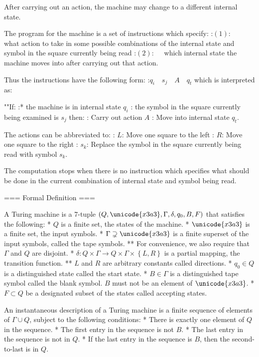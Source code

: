 After carrying out an action, the machine may change to a different internal state.


The program for the machine is a set of instructions which specify:
:$(1): \quad$ what action to take in some possible combinations of the internal state and symbol in the square currently being read
:$(2): \quad$ which internal state the machine moves into after carrying out that action.

Thus the instructions have the following form:
:$q_i \quad s_j \quad A \quad q_t$
which is interpreted as:

""If:
:* the machine is in internal state $q_i$
: the symbol in the square currently being examined is $s_j$
then:
: Carry out action $A$
: Move into internal state $q_t$.


The actions can be abbreviated to:
: $L$: Move one square to the left
: $R$: Move one square to the right
: $s_k$: Replace the symbol in the square currently being read with symbol $s_k$.


The computation stops when there is no instruction which specifies what should be done in the current combination of internal state and symbol being read.

=== Formal Definition ===


A Turing machine is a 7-tuple $\left( Q, \unicode{x3a3}, \Gamma, \delta, q_0, B, F \right)$ that satisfies the following:
* $Q$ is a finite set, the states of the machine.
* $\unicode{x3a3}$ is a finite set, the input symbols.
* $\Gamma \supsetneq \unicode{x3a3}$ is a finite superset of the input symbols, called the tape symbols.
** For convenience, we also require that $\Gamma$ and $Q$ are disjoint.
* $\delta : Q \times \Gamma \to Q \times \Gamma \times \left\lbrace L, R \right\rbrace$ is a partial mapping, the transition function.
** $L$ and $R$ are arbitrary constants called directions.
* $q_0 \in Q$ is a distinguished state called the start state.
* $B \in \Gamma$ is a distinguished tape symbol called the blank symbol. $B$ must not be an element of $\unicode{x3a3}$.
* $F \subset Q$ be a designated subset of the states called accepting states.


An instantaneous description of a Turing machine is a finite sequence of elements of $\Gamma \cup Q$, subject to the following conditions:
* There is exactly one element of $Q$ in the sequence.
* The first entry in the sequence is not $B$.
* The last entry in the sequence is not in $Q$.
* If the last entry in the sequence is $B$, then the second-to-last is in $Q$.

